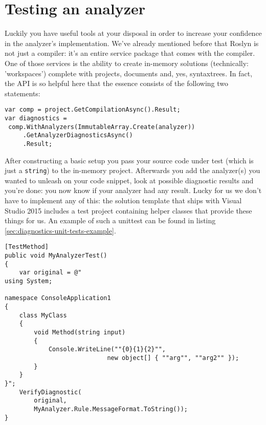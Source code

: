 \section{Testing an analyzer}
\label{sec:diagnostic-testing}

Luckily you have useful tools at your disposal in order to increase your confidence in the analyzer's implementation. We've already mentioned before that Roslyn is not just a compiler: it's an entire service package that comes with the compiler. One of those services is the ability to create in-memory \glspl{solution} (technically: 'workspaces') complete with projects, documents and, yes, \glspl{syntaxtree}. In fact, the API is so helpful here that the essence consists of the following two statements:

\begin{lstlisting}[label={sec:diagnostics-unit-tests-analysis}]
var comp = project.GetCompilationAsync().Result;
var diagnostics = 
 comp.WithAnalyzers(ImmutableArray.Create(analyzer))
     .GetAnalyzerDiagnosticsAsync()
     .Result;
\end{lstlisting}

After constructing a basic setup you pass your source code under test (which is just a \texttt{string}) to the in-memory project. Afterwards you add the analyzer(s) you wanted to unleash on your code snippet, look at possible diagnostic results and you're done: you now know if your analyzer had any result. Lucky for us we don't have to implement any of this: the \gls{solution} template that ships with Visual Studio 2015 includes a test project containing helper classes that provide these things for us. An example of such a \gls{unittest} can be found in listing \ref{sec:diagnostics-unit-tests-example}.

\begin{lstlisting}[label={sec:diagnostics-unit-tests-example}]
[TestMethod]
public void MyAnalyzerTest()
{
	var original = @"
using System;

namespace ConsoleApplication1
{
    class MyClass
    {   
        void Method(string input)
        {
            Console.WriteLine(""{0}{1}{2}"", 
							new object[] { ""arg"", ""arg2"" });
        }
    }
}";
	VerifyDiagnostic(
		original, 
		MyAnalyzer.Rule.MessageFormat.ToString());
}
\end{lstlisting}

